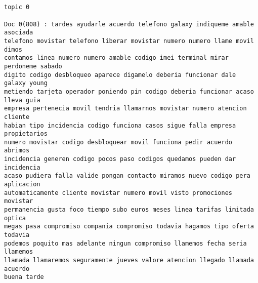     \begin{Verbatim}[commandchars=\\\{\}]


topic 0

Doc 0(808) : tardes ayudarle acuerdo telefono galaxy indiqueme amable asociada
telefono movistar telefono liberar movistar numero numero llame movil dimos
contamos linea numero numero amable codigo imei terminal mirar perdoneme sabado
digito codigo desbloqueo aparece digamelo deberia funcionar dale galaxy young
metiendo tarjeta operador poniendo pin codigo deberia funcionar acaso lleva guia
empresa pertenecia movil tendria llamarnos movistar numero atencion cliente
habian tipo incidencia codigo funciona casos sigue falla empresa propietarios
numero movistar codigo desbloquear movil funciona pedir acuerdo abrimos
incidencia generen codigo pocos paso codigos quedamos pueden dar incidencia
acaso pudiera falla valide pongan contacto miramos nuevo codigo pera aplicacion
automaticamente cliente movistar numero movil visto promociones movistar
permanencia gusta foco tiempo subo euros meses linea tarifas limitada optica
megas pasa compromiso compania compromiso todavia hagamos tipo oferta todavia
podemos poquito mas adelante ningun compromiso llamemos fecha seria llamemos
llamada llamaremos seguramente jueves valore atencion llegado llamada acuerdo
buena tarde



\end{Verbatim}
